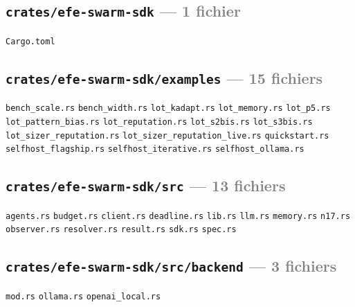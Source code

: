 \documentclass[10pt]{report}
\newcommand{\code}[1]{\texttt{\small #1}}
\begin{document}
\subsection*{\code{crates/efe-swarm-sdk} \normalfont\textcolor{grey}{--- 1 fichier}}
\begin{sloppypar}\footnotesize\raggedright
\code{Cargo.toml}
\end{sloppypar}

\subsection*{\code{crates/efe-swarm-sdk/examples} \normalfont\textcolor{grey}{--- 15 fichiers}}
\begin{sloppypar}\footnotesize\raggedright
\code{bench\_scale.rs} \;\textbullet\; \code{bench\_width.rs} \;\textbullet\; \code{lot\_kadapt.rs} \;\textbullet\; \code{lot\_memory.rs} \;\textbullet\; \code{lot\_p5.rs} \;\textbullet\; \code{lot\_pattern\_bias.rs} \;\textbullet\; \code{lot\_reputation.rs} \;\textbullet\; \code{lot\_s2bis.rs} \;\textbullet\; \code{lot\_s3bis.rs} \;\textbullet\; \code{lot\_sizer\_reputation.rs} \;\textbullet\; \code{lot\_sizer\_reputation\_live.rs} \;\textbullet\; \code{quickstart.rs} \;\textbullet\; \code{selfhost\_flagship.rs} \;\textbullet\; \code{selfhost\_iterative.rs} \;\textbullet\; \code{selfhost\_ollama.rs}
\end{sloppypar}

\subsection*{\code{crates/efe-swarm-sdk/src} \normalfont\textcolor{grey}{--- 13 fichiers}}
\begin{sloppypar}\footnotesize\raggedright
\code{agents.rs} \;\textbullet\; \code{budget.rs} \;\textbullet\; \code{client.rs} \;\textbullet\; \code{deadline.rs} \;\textbullet\; \code{lib.rs} \;\textbullet\; \code{llm.rs} \;\textbullet\; \code{memory.rs} \;\textbullet\; \code{n17.rs} \;\textbullet\; \code{observer.rs} \;\textbullet\; \code{resolver.rs} \;\textbullet\; \code{result.rs} \;\textbullet\; \code{sdk.rs} \;\textbullet\; \code{spec.rs}
\end{sloppypar}

\subsection*{\code{crates/efe-swarm-sdk/src/backend} \normalfont\textcolor{grey}{--- 3 fichiers}}
\begin{sloppypar}\footnotesize\raggedright
\code{mod.rs} \;\textbullet\; \code{ollama.rs} \;\textbullet\; \code{openai\_local.rs}
\end{sloppypar}
\end{document}
